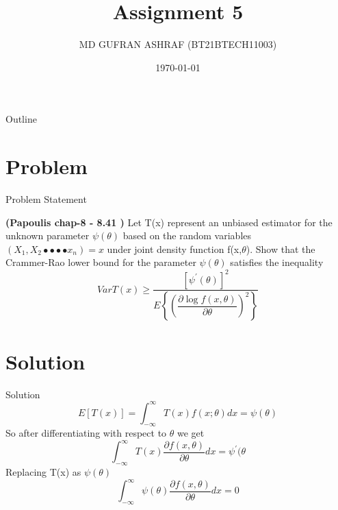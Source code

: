 \documentclass{beamer}
\title{Assignment 5 }
\author{MD GUFRAN ASHRAF (BT21BTECH11003)}
\date{\today}
\begin{document}
\begin{frame}
    \titlepage 
\end{frame}

\begin{frame}{Outline}
    \tableofcontents
\end{frame}


\section{Problem}
\begin{frame}{Problem Statement}

\textbf{(Papoulis chap-8 - 8.41 )}
Let T(x) represent an unbiased estimator for the unknown parameter ${\psi(\theta)}$ based on the
random variables $(X_{1}, X_{2} •••• x_{n}) = x$ under joint density function f(x,$\theta$). Show that the
Crammer-Rao lower bound for the parameter $\psi(\theta)$ satisfies the inequality\\
\begin{equation*}
Var{{T(x)}} \geq \dfrac{[{\psi}^{'}({\theta})]^{2}}{E \left\{ \left(\dfrac{{\partial}{\log}f(x,{\theta})}{{\partial}{\theta}}\right)^2 \right\}}
\end{equation*}

                                  

\end{frame}


\section{Solution}
\begin{frame}{Solution}
\begin{equation}
    E[T(x)] = \int_{-\infty}^{\infty}T(x)f(x;\theta)dx = \psi(\theta)
\end{equation}
So after differentiating with respect to $\theta$
we get
\begin{equation}
    \int_{-\infty}^{\infty}T(x)\dfrac{{\partial}f(x,{\theta})}{{\partial}{\theta}}dx = {\psi}^{'}({\theta} 
\end{equation}
Replacing T(x) as $\psi(\theta)$
\begin{equation}
    \int_{-\infty}^{\infty}\psi(\theta)\dfrac{{\partial}f(x,{\theta})}{{\partial}{\theta}}dx = 0
\end{equation}
\end{frame} 
\end{document}
